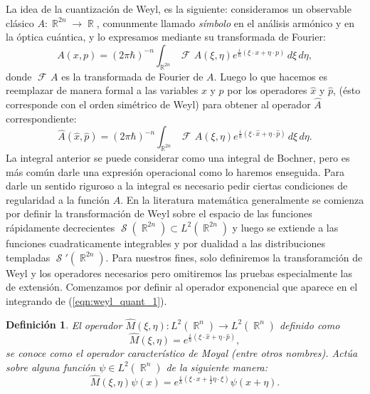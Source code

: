 \documentclass[a4paper]{report}
\DeclareMathOperator{\R}{\mathbb{R}}
\DeclareMathOperator{\Sz}{\mathcal S}
\DeclareMathOperator{\F}{\mathcal{F}\!}
\newtheorem{definition}{Definición}
\begin{document}
  La idea de la cuantización de Weyl, es la siguiente:
  consideramos un observable clásico $A : \R^{2n} \to \R$,
  comunmente llamado \textit{símbolo} en el análisis
  armónico y en la óptica cuántica, y lo expresamos mediante
  su transformada de Fourier:
  \begin{equation}
    A(x,p)
    = (2\pi\hbar)^{-n} \int_{\R^{2n}} \F A(\xi,
    \eta) e^{\frac{i}{\hbar} \left( \xi \cdot x + \eta \cdot
    p\right) } \, d\xi \, d\eta,
  \end{equation}
  donde $\F A$ es la transformada de Fourier de $A$. Luego
  lo que hacemos es reemplazar de manera formal a las
  variables $x$ y $p$ por los operadores $\hat{x}$ y
  $\hat{p}$, (ésto corresponde con el orden simétrico de
  Weyl) para obtener al operador $\hat{A}$ correspondiente:
  \begin{equation}
    \label{eqn:weyl_quant_1}
    \hat{A}(\hat{x},\hat{p})
    = (2\pi\hbar)^{-n} \int_{\R^{2n}} \F A(\xi,\eta)
      e^{\frac{i}{\hbar} \left( \xi \cdot \hat{x} + \eta
      \cdot \hat{p}\right) } \, d\xi \, d\eta.
  \end{equation}
  La integral anterior se puede considerar como una integral
  de Bochner, pero es más común darle una expresión
  operacional como lo haremos enseguida. Para darle un
  sentido riguroso a la integral es necesario pedir ciertas
  condiciones de regularidad a la función $A$. En la
  literatura matemática generalmente se comienza por definir
  la transformación de Weyl sobre el espacio de las
  funciones rápidamente decrecientes $\Sz(\R^{2n}) \subset
  L^2(\R^{2n})$ y luego se extiende a las funciones
  cuadraticamente integrables y por dualidad a las
  distribuciones templadas $\Sz'(\R^{2n})$. Para nuestros
  fines, solo definiremos la transforamción de Weyl y los
  operadores necesarios pero omitiremos las pruebas
  especialmente las de extensión.  Comenzamos por definir al
  operador exponencial que aparece en el integrando de
  (\ref{eqn:weyl_quant_1}).
  \begin{definition}
    El operador $\hat{M}(\xi, \eta) : L^2(\R^{n}) \to
    L^2(\R^{n})$ definido como
    \begin{equation*}
      \hat{M}(\xi,\eta)
      = e^{\frac{i}{\hbar} \left( \xi \cdot \hat{x} + \eta
      \cdot \hat{p} \right) },
    \end{equation*} 
    se conoce como el operador característico de Moyal
    (entre otros nombres). Actúa sobre alguna función $\psi
    \in L^2(\R^{n})$ de la siguiente manera:
    \begin{equation}
      \hat{M}(\xi,\eta)\psi(x)
      = e^{\frac{i}{\hbar} \left( \xi \cdot x + \frac{1}{2}
      \eta \cdot \xi \right)} \psi(x + \eta).
    \end{equation}
  \end{definition}
\end{document}
